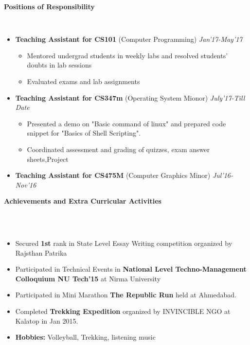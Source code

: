 \documentclass[a4paper,10pt]{article}
\newcommand{\lsep}{-0.5cm}
\newcommand{\resheading}[1]{{\small \colorbox{mygrey}{\begin{minipage}{0.975\textwidth}{\textbf{#1 \vphantom{p\^{E}}}}\end{minipage}}}}
\begin{document}
\resheading{\textbf{\large Positions of Responsibility} }\\[\lsep]
\begin{itemize}
  

	\item \textbf{Teaching Assistant for CS101} (Computer Programming) \emph{Jan'17-May'17}\\[-0.6cm]
	\begin{itemize}
    \item Mentored  undergrad students in weekly labs and resolved students’ doubts in lab sessions\\[-0.5cm]
    \item Evaluated exams and lab assignments\\[-0.5cm]
	\end{itemize}
\item \textbf{Teaching Assistant for CS347m} (Operating System Mionor) \emph{July'17-Till Date}\\[-0.6cm]
	\begin{itemize}
		\item Presented a demo on "Basic command  of linux"  and prepared code snippet for "Basics of Shell Scripting".\\[-0.5cm]
	    \item Coordinated assessment and grading of quizzes, exam answer sheets,Project	
	\end{itemize}

\item \textbf{Teaching Assistant for CS475M} (Computer Graphics Minor) \emph{Jul'16-Nov'16}\\[-0.6cm]
\end{itemize}
\vskip 0.15in


\resheading{\textbf{\large Achievements and Extra Curricular Activities}}\\[\lsep]\\[-0.3cm]
\begin{itemize}
  \item Secured \textbf{1st} rank in State Level Essay Writing competition organized by Rajsthan Patrika
  	\item Participated in Technical Events in\textbf{ National Level Techno-Management Colloquium  NU Tech'15 } at Nirma University
  	\item Participated in Mini Marathon \textbf{The Republic Run}  held at Ahmedabad.
  \item Completed \textbf{Trekking Expedition} organized by INVINCIBLE NGO at Kalatop in Jan 2015.
  \item \textbf{Hobbies:} Volleyball, Trekking, listening music
\end{itemize}
\end{document}
